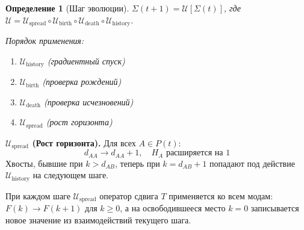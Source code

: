 \documentclass[12pt,a4paper]{article}
\newtheorem{definition}{Определение}[section]
\begin{document}
\begin{definition}[Шаг эволюции]
$\Sigma(t+1) = \mathcal{U}[\Sigma(t)]$, где $\mathcal{U} = \mathcal{U}_{\text{spread}} \circ \mathcal{U}_{\text{birth}} \circ \mathcal{U}_{\text{death}} \circ \mathcal{U}_{\text{history}}$.

Порядок применения:
\begin{enumerate}
    \item $\mathcal{U}_{\text{history}}$ (градиентный спуск)
    \item $\mathcal{U}_{\text{birth}}$ (проверка рождений)
    \item $\mathcal{U}_{\text{death}}$ (проверка исчезновений)
    \item $\mathcal{U}_{\text{spread}}$ (рост горизонта)
\end{enumerate}
\end{definition}

\textbf{$\mathcal{U}_{\text{spread}}$ (Рост горизонта).}
Для всех $A \in P(t)$:
\begin{equation}
    d_{AA} \to d_{AA} + 1, \quad H_A \text{ расширяется на } 1
\end{equation}
Хвосты, бывшие при $k > d_{AB}$, теперь при $k = d_{AB}+1$ попадают под действие $\mathcal{U}_{\text{history}}$ на следующем шаге.

При каждом шаге $\mathcal{U}_{\text{spread}}$ оператор сдвига $T$ применяется ко всем модам: $F(k) \to F(k+1)$ для $k \geq 0$, а на освободившееся место $k=0$ записывается новое значение из взаимодействий текущего шага.
\end{document}
